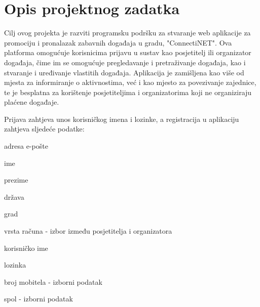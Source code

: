 \chapter{Opis projektnog zadatka}
		
		
		
		Cilj ovog projekta je razviti programsku podršku za stvaranje web aplikacije za promociju i pronalazak zabavnih događaja u gradu, "ConnectiNET". Ova platforma omogućuje korisnicima prijavu u sustav kao posjetitelj ili organizator događaja, čime im se omogućuje pregledavanje i pretraživanje događaja, kao i stvaranje i uređivanje vlastitih događaja. Aplikacija je zamišljena kao više od mjesta za informiranje o aktivnostima, već i kao mjesto za povezivanje zajednice, te je besplatna za korištenje posjetiteljima i organizatorima koji ne organiziraju plaćene događaje.
		
		Prijava zahtjeva unos korisničkog imena i lozinke, a registracija u aplikaciju zahtjeva sljedeće podatke:
		 \begin{packed_item}
			\item adresa e-pošte
		 	\item ime
		 	\item prezime
		 	\item država
			\item grad
			\item vrsta računa - izbor između posjetitelja i organizatora
		 	\item korisničko ime
		 	\item lozinka
		 	\item broj mobitela - izborni podatak
		 	\item spol - izborni podatak
		 \end{packed_item}	


